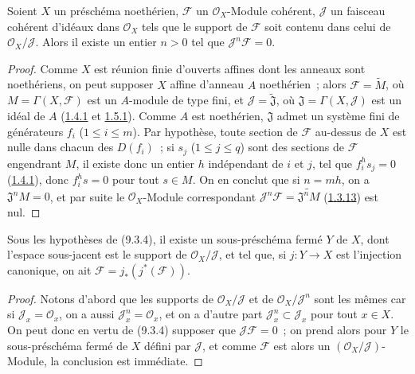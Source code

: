 \begin{proposition}[9.3.4]
\label{I.9.3.4-fr}
Soient $X$ un préschéma noethérien, $\mathscr{F}$ un
$\mathscr{O}_X$-Module cohérent, $\mathscr{J}$ un faisceau cohérent d'idéaux
dans $\mathscr{O}_X$ tels que le support de $\mathscr{F}$ soit contenu dans
celui de $\mathscr{O}_X/\mathscr{J}$. Alors il existe un entier $n>0$ tel que
$\mathscr{J}^n\mathscr{F}=0$.
\end{proposition}

\begin{proof}
Comme $X$ est réunion finie d'ouverts affines dont les anneaux sont
noethériens, on peut supposer $X$ affine d'anneau $A$ noethérien~; alors
$\mathscr{F}=\widetilde M$, où $M=\Gamma(X,\mathscr{F})$ est un $A$-module
de type fini, et $\mathscr{J}=\widetilde{\mathfrak{J}}$, où
$\mathfrak{J}=\Gamma(X,\mathscr{J})$ est un idéal de $A$
(\hyperref[I.1.4.1-fr]{1.4.1} et \hyperref[I.1.5.1-fr]{1.5.1}). Comme $A$
est noethérien, $\mathfrak{J}$ admet un système fini de générateurs $f_i$
($1\leq i\leq m$). Par hypothèse, toute section de $\mathscr{F}$ au-dessus
de $X$ est nulle dans chacun des $D(f_i)$~; si $s_j$ ($1\leq j\leq q$) sont
des sections de $\mathscr{F}$ engendrant $M$, il existe donc un entier $h$
indépendant de $i$ et $j$, tel que $f_i^h s_j=0$
(\hyperref[I.1.4.1-fr]{1.4.1}), donc $f_i^h s=0$ pour tout $s\in M$. On en
conclut que si $n=mh$, on a $\mathfrak{J}^nM=0$, et par suite le
$\mathscr{O}_X$-Module correspondant
$\mathscr{J}^n\mathscr{F}=\widetilde{\mathfrak{J}^nM}$
(\hyperref[I.1.3.13-fr]{1.3.13}) est nul.
\end{proof}

\begin{corollary}[9.3.5]
\label{I.9.3.5-fr}
Sous les hypothèses de (9.3.4), il existe un sous-préschéma fermé $Y$ de
$X$, dont l'espace sous-jacent est le support de
$\mathscr{O}_X/\mathscr{J}$, et tel que, si $j:Y\to X$ est l'injection
canonique, on ait $\mathscr{F}=j_*(j^*(\mathscr{F}))$.
\end{corollary}

\begin{proof}
Notons d'abord que les supports de $\mathscr{O}_X/\mathscr{J}$ et de
$\mathscr{O}_X/\mathscr{J}^n$ sont les mêmes car si
$\mathscr{J}_x=\mathscr{O}_x$, on a aussi
$\mathscr{J}_x^n=\mathscr{O}_x$, et on a d'autre part
$\mathscr{J}_x^n\subset\mathscr{J}_x$ pour tout $x\in X$. On peut donc en
vertu de (9.3.4) supposer que $\mathscr{J}\mathscr{F}=0$~; on prend alors
pour $Y$ le sous-préschéma fermé de $X$ défini par $\mathscr{J}$, et comme
$\mathscr{F}$ est alors un $(\mathscr{O}_X/\mathscr{J})$-Module, la
conclusion est immédiate.
\end{proof}

